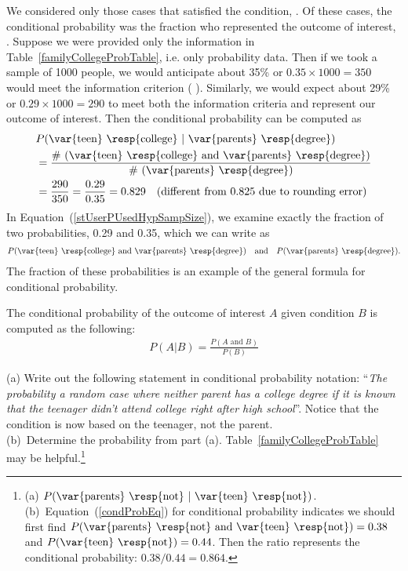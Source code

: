 We considered only those cases that satisfied the condition,  . Of these cases, the conditional probability was the fraction who represented the outcome of interest,  . Suppose we were provided only the information in Table~\ref{familyCollegeProbTable}, i.e. only probability data. Then if we took a sample of 1000 people, we would anticipate about 35\% or $0.35\times 1000 = 350$ would meet the information criterion ( ). Similarly, we would expect about 29\% or $0.29\times 1000 = 290$ to meet both the information criteria and represent our outcome of interest. Then the conditional probability can be computed as
\begin{align}
&P(\text{\var{teen} \resp{college}}\ |\ \text{\var{parents} \resp{degree}}) \notag \\
	&= \frac{\text{\# (\var{teen} \resp{college} and \var{parents} \resp{degree})}}{\text{\# (\var{parents} \resp{degree})}} \notag \\
	&= \frac{290}{350}
		= \frac{0.29}{0.35}
		= 0.829\quad\text{(different from 0.825 due to rounding error)}
\label{stUserPUsedHypSampSize}
\end{align}
In Equation~(\ref{stUserPUsedHypSampSize}), we examine exactly the fraction of two probabilities, 0.29 and 0.35, which we can write as
\begin{align*}
P(\text{\var{teen} \resp{college} and \var{parents} \resp{degree}})
	\quad\text{and}\quad
	P(\text{\var{parents} \resp{degree}}).
\end{align*}
The fraction of these probabilities is an example of the general formula for conditional probability.

\begin{termBox}{
The conditional probability of the outcome of interest $A$ given condition $B$ is computed as the following:
\begin{align}
P(A | B) = \frac{P(A\text{ and }B)}{P(B)}
\label{condProbEq}
\end{align}}
\end{termBox}

\begin{exercise}\label{familyCollegeProbOfParentsEqualNotGivenTeen}
(a) Write out the following statement in conditional probability notation: ``\emph{The probability a random case where neither parent has a college degree if it is known that the teenager didn't attend college right after high school}''. Notice that the condition is now based on the {teenager}, not the {parent}. \\[1mm]
(b)~Determine the probability from part (a). Table~\vref{familyCollegeProbTable} may be helpful.\footnote{(a) $P(\text{\var{parents} \resp{not}}\ |\ \text{\var{teen} \resp{not}})$. (b)~Equation~(\ref{condProbEq}) for conditional probability indicates we should first find $P(\text{\var{parents} \resp{not} and \var{teen} \resp{not}}) = 0.38$ and $P(\text{\var{teen} \resp{not}}) = 0.44$. Then the ratio represents the conditional probability: $0.38 / 0.44 = 0.864$.}
\end{exercise}

